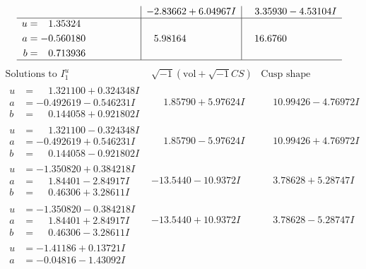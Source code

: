 \documentclass[1p]{elsarticle_modified}
\theoremstyle{definition}
\newcommand{\I}{\sqrt{-1}}
\begin{document}
$$\begin{array}{c|c|c}
 & -2.83662 + 6.04967 I & \phantom{-}3.35930 - 4.53104 I \\ \hline\begin{aligned}
u &= \phantom{-}1.35324\phantom{ +0.000000I} \\
a &= -0.560180\phantom{ +0.000000I} \\
b &= \phantom{-}0.713936\phantom{ +0.000000I}\end{aligned}
 & \phantom{-}5.98164\phantom{ +0.000000I} & \phantom{-}16.6760\phantom{ +0.000000I}\\
 \hline 
 \end{array}$$\newpage$$\begin{array}{c|c|c}  
\text{Solutions to }I^u_{1}& \I (\text{vol} + \sqrt{-1}CS) & \text{Cusp shape}\\
 \hline 
\begin{aligned}
u &= \phantom{-}1.321100 + 0.324348 I \\
a &= -0.492619 - 0.546231 I \\
b &= \phantom{-}0.144058 + 0.921802 I\end{aligned}
 & \phantom{-}1.85790 + 5.97624 I & \phantom{-}10.99426 - 4.76972 I \\ \hline\begin{aligned}
u &= \phantom{-}1.321100 - 0.324348 I \\
a &= -0.492619 + 0.546231 I \\
b &= \phantom{-}0.144058 - 0.921802 I\end{aligned}
 & \phantom{-}1.85790 - 5.97624 I & \phantom{-}10.99426 + 4.76972 I \\ \hline\begin{aligned}
u &= -1.350820 + 0.384218 I \\
a &= \phantom{-}1.84401 - 2.84917 I \\
b &= \phantom{-}0.46306 + 3.28611 I\end{aligned}
 & -13.5440 - 10.9372 I & \phantom{-}3.78628 + 5.28747 I \\ \hline\begin{aligned}
u &= -1.350820 - 0.384218 I \\
a &= \phantom{-}1.84401 + 2.84917 I \\
b &= \phantom{-}0.46306 - 3.28611 I\end{aligned}
 & -13.5440 + 10.9372 I & \phantom{-}3.78628 - 5.28747 I \\ \hline\begin{aligned}
u &= -1.41186 + 0.13721 I \\
a &= -0.04816 - 1.43092 I \\

\end{aligned}
\end{array}$$
\end{document}
